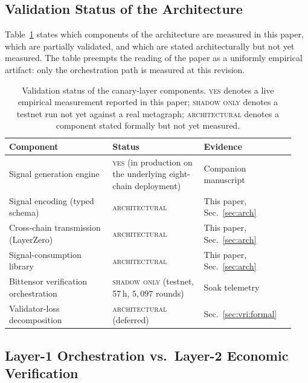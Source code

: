 \documentclass[journal]{IEEEtran}
\begin{document}
\subsection{Validation Status of the Architecture}

Table~\ref{tab:validation-status} states which components of the
architecture are measured in this paper, which are partially validated,
and which are stated architecturally but not yet measured. The table
preempts the reading of the paper as a uniformly empirical artifact:
only the orchestration path is measured at this revision.

\begin{table}[t]
\centering
\small
\caption{Validation status of the canary-layer components. \textsc{yes}
denotes a live empirical measurement reported in this paper;
\textsc{shadow only} denotes a testnet run not yet against a real
metagraph; \textsc{architectural} denotes a component stated formally
but not yet measured.}
\label{tab:validation-status}
\renewcommand{\arraystretch}{1.15}
\begin{tabular}{@{}>{\raggedright\arraybackslash}p{0.34\linewidth} >{\raggedright\arraybackslash}p{0.30\linewidth} >{\raggedright\arraybackslash}p{0.30\linewidth}@{}}
\toprule
\textbf{Component} & \textbf{Status} & \textbf{Evidence} \\
\midrule
Signal generation engine & \textsc{yes} (in production on the
underlying eight-chain deployment) & Companion
manuscript~\cite{magableh2026agenticiov} \\
Signal encoding (typed schema) & \textsc{architectural} & This paper,
Sec.~\ref{sec:arch} \\
Cross-chain transmission (LayerZero) & \textsc{architectural} & This
paper, Sec.~\ref{sec:arch} \\
Signal-consumption library & \textsc{architectural} & This paper,
Sec.~\ref{sec:arch} \\
Bittensor verification orchestration & \textsc{shadow only} (testnet,
57\,h, $5{,}097$ rounds) & Soak telemetry~\cite{omnirisk2026soak} \\
Validator-loss decomposition & \textsc{architectural} (deferred) &
Sec.~\ref{sec:vri:formal} \\
\bottomrule
\end{tabular}
\end{table}

\subsection{Layer-1 Orchestration vs.\ Layer-2 Economic Verification}
\end{document}
